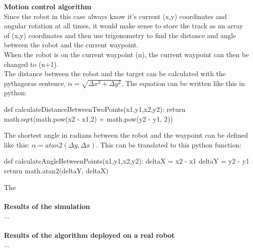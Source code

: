 \documentclass[10pt]{report}
\begin{document}
\textbf{Motion control algorithm} \\
Since the robot in this case always know it's current (x,y) coordinates and angular rotation at all times,
it would make sense to store the track as an array of (x,y) coordinates and then use trigonometry to find
the distance and angle between the robot and the current waypoint.\\
When the robot is on the current waypoint (n), the current waypoint can then be changed to (n+1).\\
The distance between the robot and the target can be calculated with the pythagoras sentence, $\alpha = \sqrt{\Delta x^{2} + \Delta y^{2}}$.
The equation can be written like this in python: 
\begin{python}
def calculateDistanceBetweenTwoPoints(x1,y1,x2,y2):
    return math.sqrt(math.pow(x2 - x1,2) + math.pow(y2 - y1, 2))
\end{python}
The shortest angle in radians between the robot and the waypoint can be defined like this: $\alpha = atan2(\Delta y, \Delta x)$.
This can be translated to this python function:
\begin{python}
def calculateAngleBetweenPoints(x1,y1,x2,y2):
    deltaX = x2 - x1
    deltaY = y2 - y1
    return math.atan2(deltaY, deltaX)
\end{python}
The
\\\\
\textbf{Results of the simulation} \\
...
\\\\
\textbf{Results of the algorithm deployed on a real robot} \\
...
\end{document}
